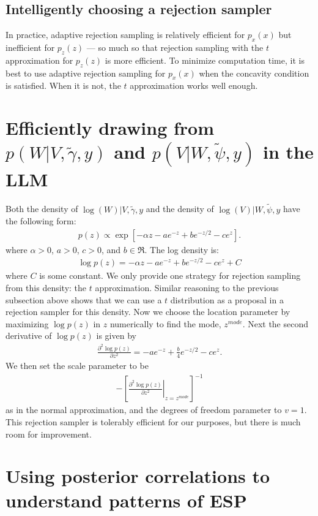 \documentclass{article}
\begin{document}
\subsection{Intelligently choosing a rejection sampler}
In practice, adaptive rejection sampling is relatively efficient for $p_x(x)$ but inefficient for $p_z(z)$ --- so much so that rejection sampling with the $t$ approximation for $p_z(z)$ is more efficient. To minimize computation time, it is best to use adaptive rejection sampling for $p_x(x)$ when the concavity condition is satisfied. When it is not, the $t$ approximation works well enough.

\section{Efficiently drawing from $p(W|V,\tilde{\gamma},y)$ and $p(V|W,\tilde{\psi},y)$ in the LLM}\label{sec:wscale}

Both the density of $\log(W)|V,\tilde{\gamma},y$ and the density of $\log(V)|W,\tilde{\psi},y$ have the following form:
\begin{align*}
  p(z)\propto \exp\left[-\alpha z - ae^{-z} + be^{-z/2} - ce^z\right].
\end{align*}
where $\alpha>0$, $a>0$, $c>0$, and $b\in \Re$. The log density is:
\begin{align*}
  \log p(z) = -\alpha z - ae^{-z} + be^{-z/2} - ce^z + C
\end{align*}
where $C$ is some constant. We only provide one strategy for rejection sampling from this density: the $t$ approximation. Similar reasoning to the previous subsection above shows that we can use a $t$ distribution as a proposal in a rejection sampler for this density. Now we choose the location parameter by maximizing $\log p(z)$ in $z$ numerically to find the mode, $z^{mode}$. Next the second derivative of $\log p(z)$ is given by
\begin{align*}
  \frac{\partial^2 \log p(z)}{\partial z^2} = -ae^{-z} + \frac{b}{4}e^{-z/2}-ce^z.
\end{align*}
We then set the scale parameter to be
\begin{align*}
  -\left[\left.\frac{\partial^2 \log p(z)}{\partial z^2}\right|_{z=z^{mode}}\right]^{-1}
\end{align*}
as in the normal approximation, and the degrees of freedom parameter to $v=1$. This rejection sampler is tolerably efficient for our purposes, but there is much room for improvement.

\section{Using posterior correlations to understand patterns of ESP}
\end{document}
